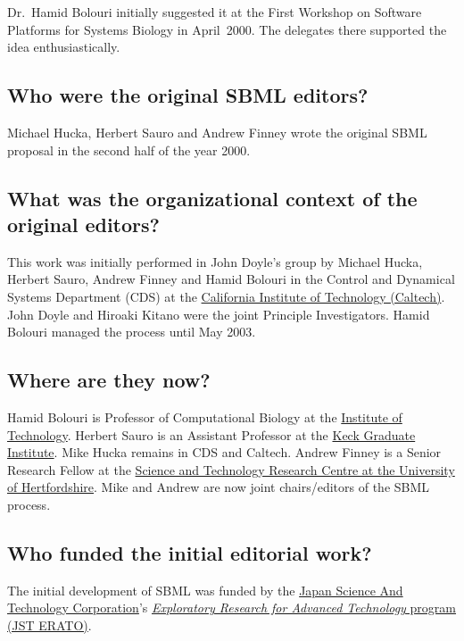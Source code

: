 \documentclass{sbmlfaq}
\begin{document}
Dr.\ Hamid Bolouri initially suggested it at the First Workshop on Software
Platforms for Systems Biology in April~2000.  The delegates there supported
the idea enthusiastically.

\subsection{Who were the original SBML editors?}

Michael Hucka, Herbert Sauro and Andrew Finney wrote the original SBML
proposal in the second half of the year 2000.

\subsection{What was the organizational context of the original editors?}

This work was initially performed in John Doyle's group by Michael Hucka,
Herbert Sauro, Andrew Finney and Hamid Bolouri in the Control and Dynamical
Systems Department (CDS) at the \href{http://www.caltech.edu}{California
  Institute of Technology (Caltech)}.  John Doyle and Hiroaki Kitano were
the joint Principle Investigators.  Hamid Bolouri managed the process until
May 2003.

\subsection{Where are they now?}

Hamid Bolouri is Professor of Computational Biology at the
\href{http://www.systemsbiology.org}{Institute of Technology}.  Herbert
Sauro is an Assistant Professor at the \href{http://www.kgi.edu}{Keck
  Graduate Institute}.  Mike Hucka remains in CDS and Caltech.  Andrew
Finney is a Senior Research Fellow at the
\href{http://strc.herts.ac.uk/}{Science and Technology Research Centre at
  the University of Hertfordshire}.  Mike and Andrew are now joint
chairs/editors of the SBML process.

\subsection{Who funded the initial editorial work?}

The initial development of SBML was funded by the
\href{http://www.jst.go.jp/EN/}{Japan Science And Technology Corporation}'s
\href{http://www.jst.go.jp/erato/}{\emph{Exploratory Research for Advanced
  Technology} program (JST ERATO)}.
\end{document}

